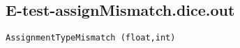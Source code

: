\subsection{E-test-assignMismatch.dice.out}
\begin{verbatim}
AssignmentTypeMismatch (float,int)

\end{verbatim}